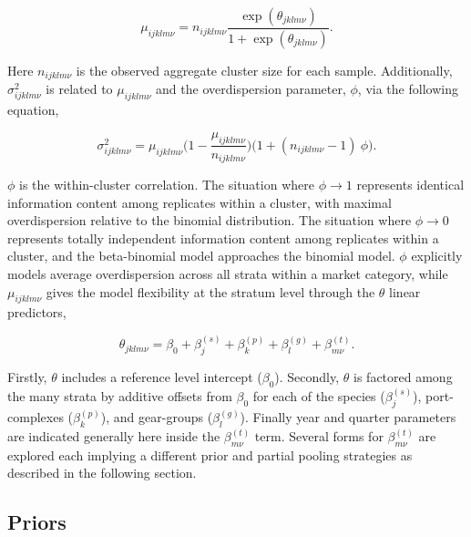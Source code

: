 \documentclass[12pt]{article}
\begin{document}
\[\mu_{ijklm\nu} = n_{ijklm\nu}\frac{\exp(\theta_{jklm\nu})}{1+\exp(\theta_{jklm\nu})}.\]

Here \(n_{ijklm\nu}\) is the observed aggregate cluster size for each
sample. Additionally, \(\sigma^2_{ijklm\nu}\) is related to \(\mu_{ijklm\nu}\) 
and the overdispersion parameter, \(\phi\), via the following equation,

\[\sigma^2_{ijklm\nu} = \mu_{ijklm\nu}\Big(1-\frac{\mu_{ijklm\nu}}{n_{ijklm\nu}}\Big)\Big(1+(n_{ijklm\nu}-1)~\phi\Big).\]

\(\phi\) is the within-cluster correlation. The situation where
\(\phi\rightarrow1\) represents identical information content among
replicates within a cluster, with maximal overdispersion relative to the
binomial distribution. The situation where \(\phi\rightarrow0\)
represents totally independent information content among replicates
within a cluster, and the beta-binomial model approaches the binomial
model. \(\phi\) explicitly models average overdispersion across all
strata within a market category, while \(\mu_{ijklm\nu}\) gives the
model flexibility at the stratum level through the \(\theta\) linear
predictors,

\[\theta_{jklm\nu} = \beta_0 + \beta^{(s)}_j + \beta^{(p)}_k + \beta^{(g)}_l + \beta^{(t)}_{m\nu}.\]

Firstly, \(\theta\) includes a reference level intercept (\(\beta_0\)).
Secondly, \(\theta\) is factored among the many strata by additive
offsets from \(\beta_0\) for each of the species (\(\beta^{(s)}_j\)),
port-complexes (\(\beta^{(p)}_k\)), and gear-groups (\(\beta^{(g)}_l\)).
Finally year and quarter parameters are indicated generally here inside
the \(\beta^{(t)}_{m\nu}\) term. Several forms for \(\beta^{(t)}_{m\nu}\) 
are explored each implying a different prior and partial pooling strategies 
as described in the following section. %

%
%
\subsection{Priors}\label{priors}
%
%

%
%
\end{document}

